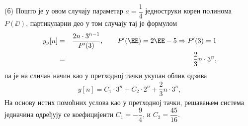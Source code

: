 (б) Пошто је у овом случају параметар $a = \dfrac{1}{4}$ једноструки корен полинома $P(\DD)$, партикуларни део у том случају тај је формулом 
\begin{eqnarray}
    y_{\rm p}[n] &=& \dfrac{ 2 n \cdot 3^{n-1} }{ P'(3) }, \qquad P'(\EE) = 2\EE - 5 \Rightarrow P'(3) = 1 \\
                 &=& \dfrac{2}{3}n \cdot 3^n,
\end{eqnarray}
па је на сличан начин као у претходној тачки укупан облик одзива 
\begin{eqnarray}
    y[n] = C_1 \cdot 3^n + C_2 \cdot 2^n + \dfrac{2}{3}n \cdot 3^{n},
\end{eqnarray}
На основу истих помоћних услова као у претходној тачки, решавањем система једначина одређују се коефицијенти 
$C_1 = - \dfrac{9}{4}$, и $C_2 = \dfrac{45}{16}$.
